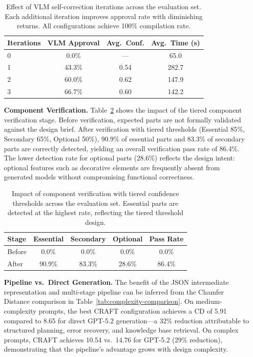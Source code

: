 \documentclass[5p,twocolumn,10pt,times]{elsarticle}
\begin{document}
\begin{table}[t]
\centering
\caption{Effect of VLM self-correction iterations across the evaluation set. Each additional iteration improves approval rate with diminishing returns. All configurations achieve 100\% compilation rate.}
\label{tab:vlm-ablation}
\small
\begin{tabular}{lccc}
\toprule
\textbf{Iterations} & \textbf{VLM Approval} & \textbf{Avg.\ Conf.} & \textbf{Avg.\ Time (s)} \\
\midrule
0 & 0.0\% & --- & 65.0 \\
1 & 43.3\% & 0.54 & 282.7 \\
2 & 60.0\% & 0.62 & 147.9 \\
3 & 66.7\% & 0.60 & 142.2 \\
\bottomrule
\end{tabular}
\end{table}

\textbf{Component Verification.} Table~\ref{tab:verif-ablation} shows the impact of the tiered component verification stage. Before verification, expected parts are not formally validated against the design brief. After verification with tiered thresholds (Essential 85\%, Secondary 65\%, Optional 50\%), 90.9\% of essential parts and 83.3\% of secondary parts are correctly detected, yielding an overall verification pass rate of 86.4\%. The lower detection rate for optional parts (28.6\%) reflects the design intent: optional features such as decorative elements are frequently absent from generated models without compromising functional correctness.

\begin{table}[t]
\centering
\caption{Impact of component verification with tiered confidence thresholds across the evaluation set. Essential parts are detected at the highest rate, reflecting the tiered threshold design.}
\label{tab:verif-ablation}
\small
\begin{tabular}{lcccc}
\toprule
\textbf{Stage} & \textbf{Essential} & \textbf{Secondary} & \textbf{Optional} & \textbf{Pass Rate} \\
\midrule
Before & 0.0\% & 0.0\% & 0.0\% & 0.0\% \\
After & 90.9\% & 83.3\% & 28.6\% & 86.4\% \\
\bottomrule
\end{tabular}
\end{table}

\textbf{Pipeline vs.\ Direct Generation.} The benefit of the JSON intermediate representation and multi-stage pipeline can be inferred from the Chamfer Distance comparison in Table~\ref{tab:complexity-comparison}. On medium-complexity prompts, the best CRAFT configuration achieves a CD of 5.91 compared to 8.65 for direct GPT-5.2 generation---a 32\% reduction attributable to structured planning, error recovery, and knowledge base retrieval. On complex prompts, CRAFT achieves 10.54 vs.\ 14.76 for GPT-5.2 (29\% reduction), demonstrating that the pipeline's advantage grows with design complexity.
\end{document}
